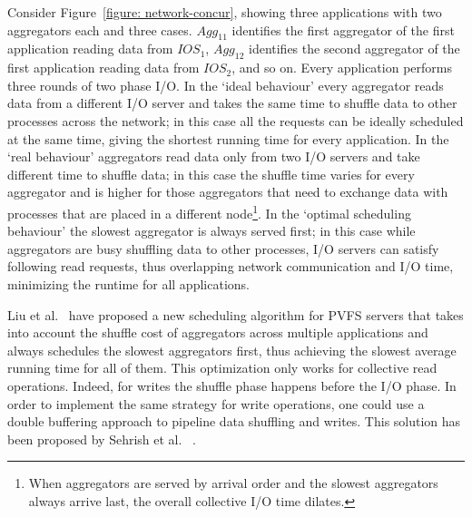 Consider Figure~\ref{figure: network-concur}, showing three applications with two aggregators each and three cases. $Agg_{11}$ identifies the first aggregator of the first application reading data from
$IOS_1$, $Agg_{12}$ identifies the second aggregator of the first application reading data from $IOS_2$, and so on. Every application performs three rounds of two phase I/O. In the `ideal behaviour' every
aggregator reads data from a different I/O server and takes the same time to shuffle data to other processes across the network; in this case all the requests can be ideally scheduled at the same time, giving
the shortest running time for every application. In the `real behaviour' aggregators read data only from two I/O servers and take different time to shuffle data; in this case the shuffle time varies for every
aggregator and is higher for those aggregators that need to exchange data with processes that are placed in a different node\footnote{When aggregators are served by arrival order and the slowest aggregators always
arrive last, the overall collective I/O time dilates.}. In the `optimal scheduling behaviour' the slowest aggregator is always served first; in this case while aggregators are busy shuffling data to other
processes, I/O servers can satisfy following read requests, thus overlapping network communication and I/O time, minimizing the runtime for all applications.

Liu et al.~\cite{Liu2013} have proposed a new scheduling algorithm for PVFS servers that takes into account the shuffle cost of aggregators across multiple applications and always schedules the slowest
aggregators first, thus achieving the slowest average running time for all of them. This optimization only works for collective read operations. Indeed, for writes the shuffle phase happens before the 
I/O phase. In order to implement the same strategy for write operations, one could use a double buffering approach to pipeline data shuffling and writes. This solution has been proposed by Sehrish et al.
~\cite{Sehrish2013}.

